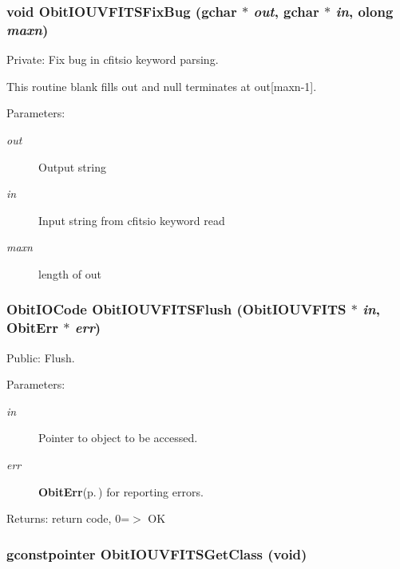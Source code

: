 \subsubsection{\setlength{\rightskip}{0pt plus 5cm}void Obit\-IOUVFITSFix\-Bug (gchar $\ast$ {\em out}, gchar $\ast$ {\em in}, {\bf olong} {\em maxn})}\label{ObitIOUVFITS_8c_a15}


Private: Fix bug in cfitsio keyword parsing. 

This routine blank fills out and null terminates at out[maxn-1]. \begin{Desc}
\item[Parameters:]
\begin{description}
\item[{\em out}]Output string \item[{\em in}]Input string from cfitsio keyword read \item[{\em maxn}]length of out \end{description}
\end{Desc}
\subsubsection{\setlength{\rightskip}{0pt plus 5cm}Obit\-IOCode Obit\-IOUVFITSFlush ({\bf Obit\-IOUVFITS} $\ast$ {\em in}, {\bf Obit\-Err} $\ast$ {\em err})}\label{ObitIOUVFITS_8c_a36}


Public: Flush. 

\begin{Desc}
\item[Parameters:]
\begin{description}
\item[{\em in}]Pointer to object to be accessed. \item[{\em err}]{\bf Obit\-Err}{\rm (p.\,\pageref{structObitErr})} for reporting errors. \end{description}
\end{Desc}
\begin{Desc}
\item[Returns:]return code, 0=$>$ OK \end{Desc}
\subsubsection{\setlength{\rightskip}{0pt plus 5cm}gconstpointer Obit\-IOUVFITSGet\-Class (void)}\label{ObitIOUVFITS_8c_a19}


